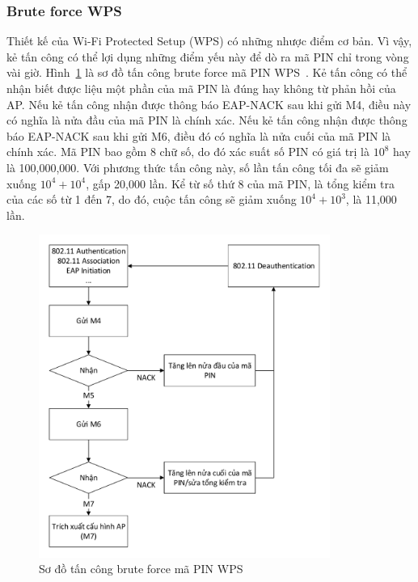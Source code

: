 \subsubsection{Brute force WPS}
Thiết kế của Wi-Fi Protected Setup (WPS) có những nhược điểm cơ bản. Vì vậy, kẻ tấn công có thể lợi dụng những điểm yếu này để dò ra mã PIN chỉ trong vòng vài giờ.  Hình~\ref{fig:brute-force-wps-pin} là sơ đồ tấn công brute force mã PIN WPS~\cite{stefan2011brute}. Kẻ tấn công có thể nhận biết được liệu một phần của mã PIN là đúng hay không từ phản hồi của AP. Nếu kẻ tấn công nhận được thông báo EAP-NACK sau khi gửi M4, điều này có nghĩa là nửa đầu của mã PIN là chính xác. Nếu kẻ tấn công nhận được thông báo EAP-NACK sau khi gửi M6, điều đó có nghĩa là nửa cuối của mã PIN là chính xác. Mã PIN bao gồm 8 chữ số, do đó xác suất số PIN có giá trị là \(10^{8}\) hay là 100,000,000. Với phương thức tấn công này, số lần tấn công tối đa sẽ giảm xuống \(10^{4} + 10^{4}\), gấp 20,000 lần. Kể từ số thứ 8 của mã PIN, là tổng kiểm tra của các số từ 1 đến 7, do đó, cuộc tấn công sẽ giảm xuống \(10^{4} + 10^{3}\), là 11,000 lần.

\begin{figure}[H]
    \centering
    \includegraphics[width=0.85\textwidth]{brute-force-wps-pin}
    \caption{
        \label{fig:brute-force-wps-pin}
        Sơ đồ tấn công brute force mã PIN WPS}
\end{figure}

